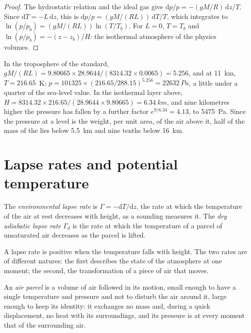 \begin{proof}
The hydrostatic relation and the ideal gas give $\mathrm dp/p = -(gM/R)\,\mathrm
dz/T$. Since $\mathrm dT = -L\,\mathrm dz$, this is $\mathrm dp/p =
(gM/(RL))\,\mathrm dT/T$, which integrates to $\ln(p/p_b) = (gM/(RL))
\ln(T/T_b)$. For $L = 0$, $T = T_b$ and $\ln(p/p_b) = -(z - z_b)/H$: the
isothermal atmosphere of the physics volumes.
\end{proof}

In the troposphere of the standard, $gM/(RL) = 9.80665 \times 28.9644 /
(8314.32 \times 0.0065) = 5.256$, and at \qty{11}{km}, $T = 216.65$~K:
$p = \num{101325} \times (216.65/288.15)^{5.256} = \qty{22632}{Pa}$, a little
under a quarter of the sea-level value. In the isothermal layer above, $H =
8314.32 \times 216.65/(28.9644 \times 9.80665) = \qty{6.34}{km}$, and nine
kilometres higher the pressure has fallen by a further factor $e^{9/6.34} =
4.13$, to \qty{5475}{Pa}. Since the pressure at a level is the weight, per unit
area, of the air above it, half of the mass of the  lies below
\qty{5.5}{km} and nine tenths below \qty{16}{km}.

\section{Lapse rates and potential temperature}\label{sec:b1:fluid-envelopes-structure:lapse}

\begin{definition}\label{def:b1:fluid-envelopes-structure:lapse-rate}
The \emph{environmental lapse rate} is $\Gamma =
-\mathrm dT/\mathrm dz$, the rate at which the temperature of the air at rest
decreases with height, as a sounding measures it. The \emph{dry adiabatic lapse
rate} $\Gamma_d$ is the rate at which the
temperature of a parcel of unsaturated air decreases as the parcel is lifted.
\end{definition}

A lapse rate is positive when the temperature falls with height. The two rates
are of different natures: the first describes the state of the atmosphere at one
moment; the second, the transformation of a piece of air that moves.

\begin{definition}\label{def:b1:fluid-envelopes-structure:parcel}
An \emph{air parcel} is a volume of air followed in its
motion, small enough to have a single temperature and pressure and not to
disturb the air around it, large enough to keep its identity: it exchanges no
mass and, during a quick displacement, no heat with its surroundings, and its
pressure is at every moment that of the surrounding air.
\end{definition}

